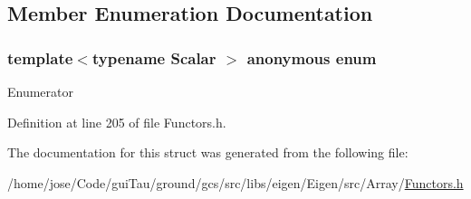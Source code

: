 \subsection{Member Enumeration Documentation}
\hypertarget{structei__functor__traits_3_01ei__scalar__cube__op_3_01_scalar_01_4_01_4_a2d1019410fc8333cb4c967141407528c}{\subsubsection[{anonymous enum}]{\setlength{\rightskip}{0pt plus 5cm}template$<$typename Scalar $>$ anonymous enum}}\label{structei__functor__traits_3_01ei__scalar__cube__op_3_01_scalar_01_4_01_4_a2d1019410fc8333cb4c967141407528c}
\begin{Desc}
\item[Enumerator]\par
\begin{description}
\item[{\em 
\hypertarget{structei__functor__traits_3_01ei__scalar__cube__op_3_01_scalar_01_4_01_4_a2d1019410fc8333cb4c967141407528caa32802b5e4d59ef27fc415148d59ca02}{Cost}\label{structei__functor__traits_3_01ei__scalar__cube__op_3_01_scalar_01_4_01_4_a2d1019410fc8333cb4c967141407528caa32802b5e4d59ef27fc415148d59ca02}
}]\end{description}
\end{Desc}


Definition at line 205 of file Functors.\-h.



The documentation for this struct was generated from the following file\-:\begin{DoxyCompactItemize}
\item 
/home/jose/\-Code/gui\-Tau/ground/gcs/src/libs/eigen/\-Eigen/src/\-Array/\hyperlink{_array_2_functors_8h}{Functors.\-h}\end{DoxyCompactItemize}

